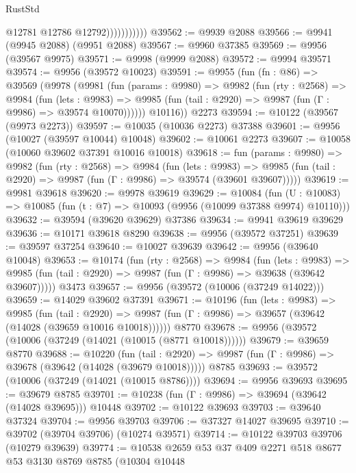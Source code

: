 \begin{lexlean}{RustStd}
\begin{coremodule}
                          @12781
                          @12786
                          @12792)))))))))))
@39562 := @9939 @2088
@39566 := @9941 (@9945 @2088) (@9951 @2088)
@39567 := @9960 @37385
@39569 := @9956 (@39567 @9975)
@39571 := @9998 (@9999 @2088)
@39572 := @9994 @39571
@39574 := @9956 (@39572 @10023)
@39591 := @9955
    (fun (fn : @86) =>
    @39569
      (@9978
        (@9981
          (fun (params : @9980) =>
          @9982
            (fun (rty : @2568) =>
            @9984
              (fun (lets : @9983) =>
              @9985 (fun (tail : @2920) => @9987 (fun (Γ : @9986) => @39574 @10070))))))
        @10116))
    @2273
@39594 := @10122 (@39567 (@9973 @2273))
@39597 := @10035 (@10036 @2273) @37388
@39601 := @9956 (@10027 (@39597 @10044) @10048)
@39602 := @10061 @2273
@39607 := @10058 (@10060 @39602 @37391 @10016 @10018)
@39618 := fun (params : @9980) =>
  @9982
    (fun (rty : @2568) =>
    @9984
      (fun (lets : @9983) =>
      @9985 (fun (tail : @2920) => @9987 (fun (Γ : @9986) => @39574 (@39601 @39607)))))
@39619 := @9981 @39618
@39620 := @9978 @39619
@39629 := @10084
    (fun (U : @10083) => @10085 (fun (t : @7) => @10093 (@9956 (@10099 @37388 @9974) @10110)))
@39632 := @39594 (@39620 @39629) @37386
@39634 := @9941 @39619 @39629
@39636 := @10171 @39618 @8290
@39638 := @9956 (@39572 @37251)
@39639 := @39597 @37254
@39640 := @10027 @39639
@39642 := @9956 (@39640 @10048)
@39653 := @10174
    (fun (rty : @2568) =>
    @9984
      (fun (lets : @9983) =>
      @9985 (fun (tail : @2920) => @9987 (fun (Γ : @9986) => @39638 (@39642 @39607)))))
    @3473
@39657 := @9956 (@39572 (@10006 (@37249 @14022)))
@39659 := @14029 @39602 @37391
@39671 := @10196
    (fun (lets : @9983) =>
    @9985
      (fun (tail : @2920) =>
      @9987 (fun (Γ : @9986) => @39657 (@39642 (@14028 (@39659 @10016 @10018))))))
    @8770
@39678 := @9956 (@39572 (@10006 (@37249 (@14021 (@10015 (@8771 @10018))))))
@39679 := @39659 @8770
@39688 := @10220
    (fun (tail : @2920) => @9987 (fun (Γ : @9986) => @39678 (@39642 (@14028 (@39679 @10018)))))
    @8785
@39693 := @39572 (@10006 (@37249 (@14021 (@10015 @8786))))
@39694 := @9956 @39693
@39695 := @39679 @8785
@39701 := @10238 (fun (Γ : @9986) => @39694 (@39642 (@14028 @39695))) @10448
@39702 := @10122 @39693
@39703 := @39640 @37324
@39704 := @9956 @39703
@39706 := @37327 @14027 @39695
@39710 := @39702 (@39704 @39706) (@10274 @39571)
@39714 := @10122 @39703 @39706 (@10279 @39639)
@39774 := @10538
    @2659
    @53
    @37
    @409
    @2271
    @518
    @8677
    @53
    @3130
    @8769
    @8785
    (@10304
      @10448

\end{coremodule}
\end{lexlean}
